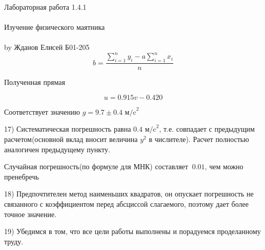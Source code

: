 \documentclass{astroedu-lab}
\begin{document}
\begin{problem}{\huge Лабораторная работа 1.4.1\\\\Изучение физического маятника\\\\by Жданов Елисей Б01-205}
\begin{equation}
	b = \frac{\sum_{i = 1}^{n} y_i - a \sum_{i = 1}^{n} x_i}{n}
\end{equation}

Полученная прямая

\begin{equation}
	u = 0.915 v - 0.420
\end{equation}

Соответствует значению $g = 9.7 \pm 0.4 \text{ м/c}^2$

17) Систематическая погрешность равна $0.4 \text{ м/c}^2$, т.е. совпадает с предыдущим расчетом(основной вклад вносит величина $y^2$ в числителе). Расчет полностью аналогичен предыдущему пункту.

Случайная погрешность(по формуле для МНК) составляет $~0.01$, чем можно пренебречь

18) Предпочтителен метод наименьших квадратов, он опускает погрешность не связанного с коэффициентом перед абсциссой слагаемого, поэтому дает более точное значение.

19) Убедимся в том, что все цели работы выполнены и порадуемся проделанному труду.

\end{problem}
\end{document}
